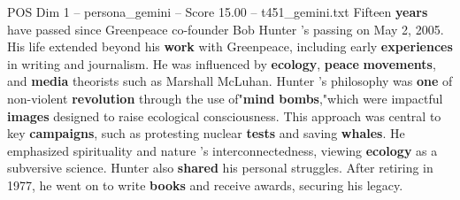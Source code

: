 \begin{textsample}{POS Dim 1 – persona\_gemini – Score 15.00 – t451\_gemini.txt}  \label{ex:f1_pos_041}
Fifteen \textbf{years} have passed since Greenpeace co-founder Bob Hunter 's passing on May 2, 2005.
His life extended beyond his \textbf{work} with Greenpeace, including early \textbf{experiences} in writing and journalism.
He was influenced by \textbf{ecology}, \textbf{peace} \textbf{movements}, and \textbf{media} theorists such as Marshall McLuhan.
Hunter 's philosophy was \textbf{one} of non-violent \textbf{revolution} through the use of"\textbf{mind} \textbf{bombs},"which were impactful \textbf{images} designed to raise ecological consciousness.
This approach was central to key \textbf{campaigns}, such as protesting nuclear \textbf{tests} and saving \textbf{whales}.
He emphasized spirituality and nature 's interconnectedness, viewing \textbf{ecology} as a subversive science.
Hunter also \textbf{shared} his personal struggles.
After retiring in 1977, he went on to write \textbf{books} and receive awards, securing his legacy.

\end{textsample}
